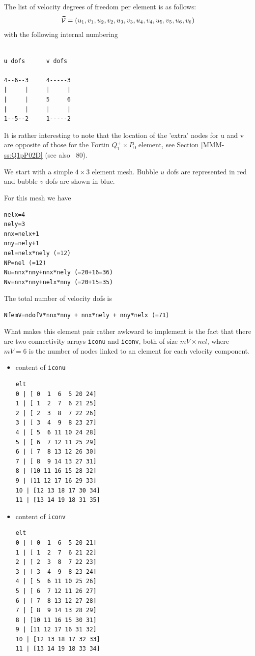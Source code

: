 The list of velocity degrees of freedom per element is as follows:
\[
\vec{\cal V} = (u_1,v_1,u_2,v_2,u_3,v_3,u_4,v_4,u_5,v_5,u_6,v_6)
\]
with the following internal numbering
\begin{verbatim}

u dofs      v dofs

4--6--3     4-----3
|     |     |     |
|     |     5     6
|     |     |     |
1--5--2     1-----2

\end{verbatim}
It is rather interesting to note that the location of the 'extra' 
nodes for u and v are opposite of those for the Fortin $Q_1^+\times P_0$ element, see
Section \ref{MMM-ss:Q1pP02D} (see also \stone~80).

We start with a simple $4\times 3$ element mesh.
Bubble $u$ dofs are represented in red and bubble $v$ dofs are shown in blue.





For this mesh we have 

\begin{lstlisting}
nelx=4
nely=3
nnx=nelx+1
nny=nely+1
nel=nelx*nely (=12) 
NP=nel (=12)
Nu=nnx*nny+nnx*nely (=20+16=36)
Nv=nnx*nny+nelx*nny (=20+15=35)
\end{lstlisting}

The total number of velocity dofs is 
\begin{lstlisting}
NfemV=ndofV*nnx*nny + nnx*nely + nny*nelx (=71)
\end{lstlisting}

What makes this element pair rather awkward to implement is the fact that 
there are two connectivity arrays {\tt iconu} and {\tt iconv}, both of size $mV\times nel$, where 
$mV=6$ is the number of nodes linked to an element for each velocity component. 
\begin{itemize}
\item content of {\tt iconu}
\begin{verbatim}
elt
0 | [ 0  1  6  5 20 24]
1 | [ 1  2  7  6 21 25]
2 | [ 2  3  8  7 22 26]
3 | [ 3  4  9  8 23 27]
4 | [ 5  6 11 10 24 28]
5 | [ 6  7 12 11 25 29]
6 | [ 7  8 13 12 26 30]
7 | [ 8  9 14 13 27 31]
8 | [10 11 16 15 28 32]
9 | [11 12 17 16 29 33]
10 | [12 13 18 17 30 34]
11 | [13 14 19 18 31 35]
\end{verbatim}
\item content of {\tt iconv}
\begin{verbatim}
elt
0 | [ 0  1  6  5 20 21]
1 | [ 1  2  7  6 21 22]
2 | [ 2  3  8  7 22 23]
3 | [ 3  4  9  8 23 24]
4 | [ 5  6 11 10 25 26]
5 | [ 6  7 12 11 26 27]
6 | [ 7  8 13 12 27 28]
7 | [ 8  9 14 13 28 29]
8 | [10 11 16 15 30 31]
9 | [11 12 17 16 31 32]
10 | [12 13 18 17 32 33]
11 | [13 14 19 18 33 34]
\end{verbatim}
\end{itemize}

